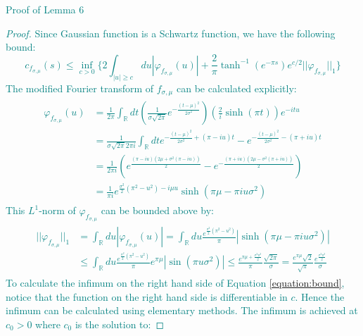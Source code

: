 \documentclass[a4paper,11pt]{article}
\theoremstyle{definition}
\newcommand{\lb}{\left(}
\newcommand{\rb}{\right)}
\newcommand{\YC}[1]{\textcolor{teal}{#1}}
\begin{document}
\YC{
Proof of Lemma 6
\begin{proof}
    Since Gaussian function is a Schwartz function, we have the following bound:
    \begin{equation}\label{equation:bound}
        c_{f_{\sigma,\mu}}(s) \leq \inf_{c > 0}\{2\int_{|u|\geq c}du |\varphi_{f_{\sigma,\mu}}(u)| + \frac{2}{\pi}\tanh^{-1}(e^{-\pi s})e^{c/2}||\varphi_{f_{\sigma,\mu}}||_1\}
    \end{equation}
    The modified Fourier transform of $f_{\sigma,\mu}$ can be calculated explicitly:
    \begin{align}
        \begin{split}
            \varphi_{f_{\sigma,\mu}}(u) &= \frac{1}{2\pi}\int_\mathbb{R} dt \lb \frac{1}{\sigma\sqrt{2\pi}}e^{-\frac{(t - \mu)^2}{2\sigma^2}} \rb\lb \frac{2}{i}\sinh(\pi t) \rb e^{-it u}
            \\&
            =\frac{1}{\sigma\sqrt{2\pi }2\pi i}\int_\mathbb{R} dt e^{-\frac{(t-  \mu)^2}{2\sigma^2} + (\pi - i u) t} - e^{-\frac{(t - \mu)^2}{2\sigma^2} - (\pi + i u) t}
            \\&
            =\frac{1}{2\pi i}\lb e^{\frac{(\pi - iu)(2\mu + \sigma^2(\pi - iu))}{2}} - e^{-\frac{(\pi + iu)(2\mu - \sigma^2(\pi + iu))}{2}}\rb
            \\&
            =\frac{1}{\pi i}e^{\frac{\sigma^2}{2}(\pi^2 - u^2) - i\mu u}\sinh(\pi \mu  - \pi i u\sigma^2)
        \end{split}
    \end{align}
    This $L^1$-norm of $\varphi_{f_{\sigma,\mu}}$ can be bounded above by:
    \begin{align}
        \begin{split}
            ||\varphi_{f_{\sigma,\mu}}||_1 &= \int_\mathbb{R} du |\varphi_{f_{\sigma,\mu}}(u)| = \int_\mathbb{R} du \frac{e^{\frac{\sigma^2}{2}(\pi^2 - u^2)}}{\pi}|\sinh(\pi\mu - \pi i u \sigma^2)|
            \\&
            \leq \int_\mathbb{R}du\frac{e^{\frac{\sigma^2}{2}(\pi^2 - u^2)}}{\pi}e^{\pi\mu}|\sin(\pi u \sigma^2)|\leq \frac{e^{\pi\mu + \frac{\sigma^2\pi^2}{2}}}{\pi}\frac{\sqrt{2\pi}}{\sigma} = \frac{e^{\pi\mu}\sqrt{2}}{\sqrt{\pi}}\frac{e^{\frac{\sigma^2\pi^2}{2}}}{\sigma}
        \end{split}
    \end{align}
    To calculate the infimum on the right hand side of Equation \ref{equation:bound}, notice that the function on the right hand side is differentiable in $c$. Hence the infimum can be calculated using elementary methods. The infimum is achieved at $c_0 > 0$ where $c_0$ is the solution to:

\end{proof}}
\end{document}
